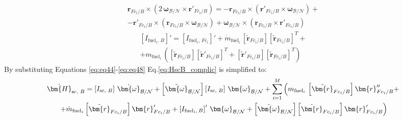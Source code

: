 \begin{multline}\label{eq:eq47}
	\bm{r}_{Fc_i/B} \times \left(2\,\bm{\omega}_{\mathcal{B}/\mathcal{N}} \times \bm{r}'_{Fc_i/B}\right) =-\bm{r}_{Fc_i/B} \times \left( \bm{r}'_{Fc_i/B} \times \bm{\omega}_{\mathcal{B}/\mathcal{N}}\right)
	+\\-\bm{r}'_{Fc_i/B} \times \left( \bm{r}_{Fc_i/B} \times \bm{\omega}_{\mathcal{B}/\mathcal{N}}\right) + \bm{\omega}_{\mathcal{B}/\mathcal{N}} \times \left(\bm{r}_{Fc_i/B}\times \bm{r}'_{Fc_i/B}\right)
\end{multline}
\begin{multline}\label{eq:eq48}
	\left[I_{\text{fuel}_i,\,B}\right]'= \left[I_{\text{fuel}_i,\,Fc_i}\right]' + \dot{m}_{\text{fuel}_i}\, \left[\tilde{\bm{r}}_{Fc_i/B}\right]\left[\tilde{\bm{r}}_{Fc_i/B}\right]^T +\\+ m_{\text{fuel}_i}\, \left(\left[\tilde{\bm{r}}_{Fc_i/B}\right]\left[\tilde{\bm{r}}'_{Fc_i/B}\right]^T+ \left[\tilde{\bm{r}}'_{Fc_i/B}\right]\left[\tilde{\bm{r}}_{Fc_i/B}\right]^T\right)
\end{multline}
By substituting Equations \eqref{eq:eq44}-\eqref{eq:eq48} Eq.\eqref{eq:HscB_complic} is simplified to:
\begin{multline}\label{eq:eq49}
	\dot{\bm{H}}_{\text{sc, }B} = \left[I_{\text{sc, }B}\right]\,\dot{\bm{\omega}}_{\cal{B}/\cal{N}} + \left[\tilde{\bm{\omega}}_{\cal{B}/\cal{N}}\right]\left[I_{\text{sc, }B}\right]\,\bm{\omega}_{\cal{B}/\cal{N}} + \sum_{i=1}^{M}\left(m_{\text{fuel}_i}\,\left[\tilde{\bm{r}}_{Fc_i/B}\right] \bm{r}''_{Fc_i/B} +\right. \\
	\left.+ \dot{m}_{\text{fuel}_i} \left[\tilde{\bm{r}}_{Fc_i/B}\right]\bm{r}'_{Fc_i/B}+ \left[I_{\text{fuel}_i,\,B}\right]' \, \bm{\omega}_{\cal{B}/\cal{N}}
	+ \left[\tilde{\bm{\omega}}_{\mathcal{B}/\mathcal{N}}\right] \left[\tilde{\bm{r}}_{Fc_i/B}\right] \bm{r}'_{Fc_i/B}\right)
\end{multline}

